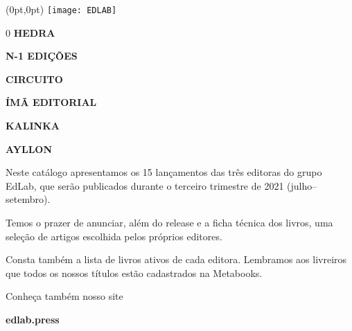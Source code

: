 \begin{textblock*}{5.625in}(0pt,0pt)%
\vspace*{-3cm}
\hspace*{-2.1cm}\texttt{[image: EDLAB]}
\end{textblock*}

\pagebreak

\pagestyle{indice}

{}

\vspace{1.2cm}

{\LARGE

\hspace*{6.8cm}0\pageref{hedra} \textbf{HEDRA}

\hspace*{6.8cm}\pageref{n-1} \textbf{N-1 EDIÇÕES}

\hspace*{6.8cm}\pageref{circuito} \textbf{CIRCUITO}

\hspace*{6.8cm}\pageref{ima} \textbf{ÍMÃ EDITORIAL}


\hspace*{6.8cm}\pageref{kalinka} \textbf{KALINKA}

\hspace*{6.8cm}\pageref{ayllon} \textbf{AYLLON}\\


}


\hspace*{-7cm}\hrulefill\hspace*{-7cm}

\vspace{1cm}

\hspace*{-.5cm}\parbox{180pt}{\raggedright 
Neste catálogo apresentamos os 15
lançamentos das três editoras do grupo EdLab, que serão publicados durante o
terceiro trimestre de 2021 (julho--setembro). 

Temos o prazer de anunciar, além do release e a ficha técnica dos livros, uma 
seleção de artigos escolhida pelos próprios editores. 

Consta também a lista de 
livros ativos de cada editora. Lembramos aos livreiros que todos os nossos títulos
estão cadastrados na Metabooks.

Conheça também nosso site

\textbf{edlab.press}
} %

